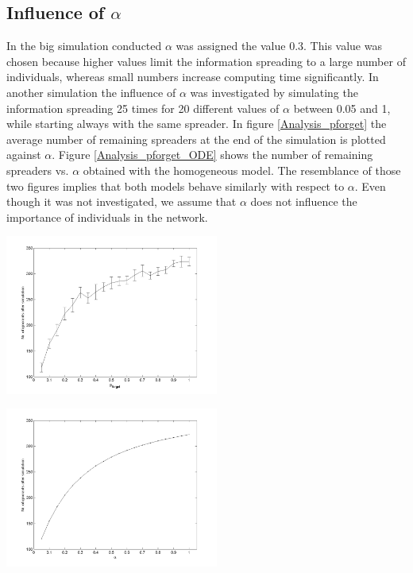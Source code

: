 \subsection{Influence of $\alpha$}


In the big simulation conducted $\alpha$ was assigned the value 0.3. This value was chosen because higher values limit the information spreading to a large number of individuals, whereas small numbers increase computing time significantly. In another simulation the influence of $\alpha$ was investigated by simulating the information spreading 25 times for 20 different values of $\alpha$ between 0.05 and 1, while starting always with the same spreader. In figure \ref{Analysis_pforget} the average number of remaining spreaders at the end of the simulation is plotted against $\alpha$. Figure \ref{Analysis_pforget_ODE} shows the number of remaining spreaders vs. $\alpha$ obtained with the homogeneous model. The resemblance of those two figures implies that both models behave similarly with respect to $\alpha$. Even though  it was not investigated, we assume that $\alpha$ does not influence the importance of individuals in the network.

\begin{minipage}{0.5\textwidth}
\includegraphics[width=7cm]{Analysis_pforget}
\label{Analysis_pforget}
\end{minipage}
\begin{minipage}{0.5\textwidth}
\includegraphics[width=7cm]{Analysis_pforget_ODE}
\label{Analysis_pforget_ODE}
\end{minipage}





